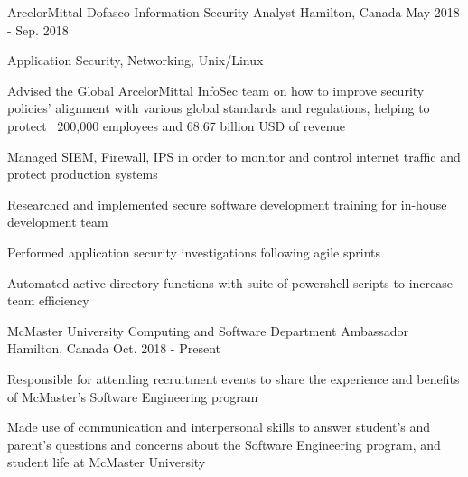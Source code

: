 

\begin{cventries}

\vspace{-2mm}
  \cventry
    {ArcelorMittal Dofasco} %
    {Information Security Analyst} %
    {Hamilton, Canada} %
    {May 2018 - Sep. 2018} %
    {
      \begin{cvitems} %
	\item{ Application Security, Networking, Unix/Linux }
        \item {Advised the Global ArcelorMittal InfoSec team on how to improve security policies' alignment 
with various global standards and regulations, helping to protect ~200,000 employees and 68.67 
billion USD of revenue}
    	\item {Managed SIEM, Firewall, IPS in order to monitor and control internet traffic and protect production systems}
    	\item {Researched and implemented secure software development training for in-house development team}
    	\item {Performed application security investigations following agile sprints}
	\item {Automated active directory functions with suite of powershell scripts to increase team efficiency}
      \end{cvitems}
    }

  \cventry
    {McMaster University} %
    {Computing and Software Department Ambassador} %
    {Hamilton, Canada} %
    {Oct. 2018 - Present} %
    {
      \begin{cvitems} %
  \item{Responsible for attending recruitment events to share the experience and benefits of McMaster's Software Engineering program}
  \item{Made use of communication and interpersonal skills to answer student's and parent's questions and concerns about the Software Engineering program, and student life at McMaster University }
      \end{cvitems}
    }



\end{cventries}
